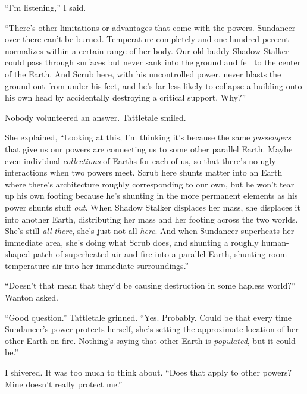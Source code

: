 ``I'm listening,'' I said.



``There's other limitations or advantages that come with the powers.  Sundancer over there can't be burned.  Temperature completely and one hundred percent normalizes within a certain range of her body.  Our old buddy Shadow Stalker could pass through surfaces but never sank into the ground and fell to the center of the Earth.  And Scrub here, with his uncontrolled power, never blasts the ground out from under his feet, and he's far less likely to collapse a building onto his own head by accidentally destroying a critical support.  Why?''



Nobody volunteered an answer.  Tattletale smiled.



She explained, ``Looking at this, I'm thinking it's because the same \emph{passengers} that give us our powers are connecting us to some other parallel Earth.  Maybe even individual \emph{collections} of Earths for each of us, so that there's no ugly interactions when two powers meet.  Scrub here shunts matter into an Earth where there's architecture roughly corresponding to our own, but he won't tear up his own footing because he's shunting in the more permanent elements as his power shunts stuff \emph{out}.  When Shadow Stalker displaces her mass, she displaces it into another Earth, distributing her mass and her footing across the two worlds.  She's still\emph{ all }\emph{there}, she's just not all \emph{here}.  And when Sundancer superheats her immediate area, she's doing what Scrub does, and shunting a roughly human-shaped patch of superheated air and fire into a parallel Earth, shunting room temperature air into her immediate surroundings.''



``Doesn't that mean that they'd be causing destruction in some hapless world?'' Wanton asked.



``Good question.'' Tattletale grinned.  ``Yes.  Probably.  Could be that every time Sundancer's power protects herself, she's setting the approximate location of her other Earth on fire.  Nothing's saying that other Earth is \emph{populated}, but it could be.''



I shivered.  It was too much to think about.  ``Does that apply to other powers?  Mine doesn't really protect me.''




